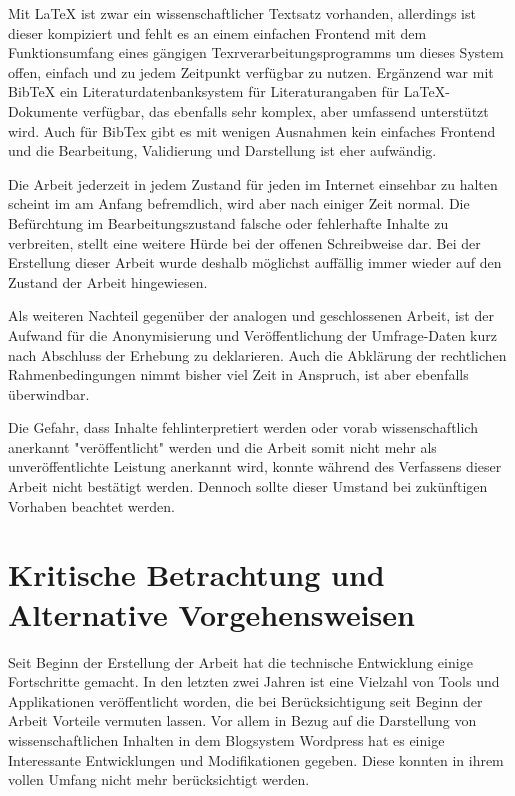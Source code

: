 Mit LaTeX ist zwar ein wissenschaftlicher Textsatz vorhanden, allerdings ist dieser kompiziert und fehlt es an einem einfachen Frontend mit dem Funktionsumfang eines gängigen Texrverarbeitungsprogramms um dieses System offen, einfach und zu jedem Zeitpunkt verfügbar zu nutzen. Ergänzend war mit BibTeX ein Literaturdatenbanksystem für Literaturangaben für LaTeX-Dokumente verfügbar, das ebenfalls sehr komplex, aber umfassend unterstützt wird. Auch für BibTex gibt es mit wenigen Ausnahmen kein einfaches Frontend und die Bearbeitung, Validierung und Darstellung ist eher aufwändig.

Die Arbeit jederzeit in jedem Zustand für jeden im Internet einsehbar zu halten scheint im am Anfang befremdlich, wird aber nach einiger Zeit normal. Die Befürchtung im Bearbeitungszustand falsche oder fehlerhafte Inhalte zu verbreiten, stellt eine weitere Hürde bei der offenen Schreibweise dar. Bei der Erstellung dieser Arbeit wurde deshalb möglichst auffällig immer wieder auf den Zustand der Arbeit hingewiesen.

Als weiteren Nachteil gegenüber der analogen und geschlossenen Arbeit, ist der Aufwand für die Anonymisierung und Veröffentlichung der Umfrage-Daten kurz nach Abschluss der Erhebung zu deklarieren. Auch die Abklärung der rechtlichen Rahmenbedingungen nimmt bisher viel Zeit in Anspruch, ist aber ebenfalls überwindbar.

Die Gefahr, dass Inhalte fehlinterpretiert werden oder vorab wissenschaftlich anerkannt "veröffentlicht" werden und die Arbeit somit nicht mehr als unveröffentlichte Leistung anerkannt wird, konnte während des Verfassens dieser Arbeit nicht bestätigt werden. Dennoch sollte dieser Umstand bei zukünftigen Vorhaben beachtet werden.

\section{Kritische Betrachtung und Alternative Vorgehensweisen}

Seit Beginn der Erstellung der Arbeit hat die technische Entwicklung einige Fortschritte gemacht. In den letzten zwei Jahren ist eine Vielzahl von Tools und Applikationen veröffentlicht worden, die bei Berücksichtigung seit Beginn der Arbeit Vorteile vermuten lassen. Vor allem in Bezug auf die Darstellung von wissenschaftlichen Inhalten in dem Blogsystem Wordpress hat es einige Interessante Entwicklungen und Modifikationen gegeben. Diese konnten in ihrem vollen Umfang nicht mehr berücksichtigt werden.

